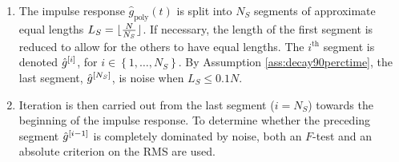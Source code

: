 \begin{enumerate}
  \item The impulse response $\hat{g}_\mathrm{poly}(t)$ is split into $N_S$ segments of approximate equal lengths
$L_S = \lfloor \frac{N}{N_S} \rfloor$. If necessary, the length of the first segment is reduced to allow for the others to have equal lengths.
The $i^{\text{th}}$ segment is denoted ${\hat{g}}^{[i]}$, for $i \in \left\{1,\ldots,N_S\right\}$.
  By Assumption \ref{ass:decay90perctime}, the last segment, ${\hat{g}}^{[N_S]}$, is noise when $L_S \leqslant 0.1N$.
  
  \item Iteration is then carried out from the last segment ($i = N_S$) towards the beginning of the impulse response. To determine whether the preceding segment ${\hat{g}}^{[i-1]}$ is completely dominated by noise,  both an $F$-test and an absolute criterion on the RMS are used.


\end{enumerate}
